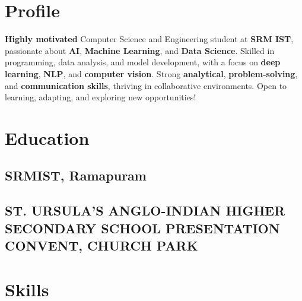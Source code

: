 \documentclass[]{deedy-resume-openfont}
\begin{document}
\vspace{24pt}

\begin{minipage}[t]{0.45\textwidth} 

\section{\textbf{Profile}}
\vspace{2pt}

\textbf{Highly motivated} Computer Science and Engineering student at \textbf{SRM IST}, passionate about \textbf{AI}, \textbf{Machine Learning}, and \textbf{Data Science}. Skilled in programming, data analysis, and model development, with a focus on \textbf{deep learning}, \textbf{NLP}, and \textbf{computer vision}. Strong \textbf{analytical}, \textbf{problem-solving}, and \textbf{communication skills}, thriving in collaborative environments. Open to learning, adapting, and exploring new opportunities!

\vspace{4pt}

\section{Education}
\vspace{2pt}
\subsection{SRMIST, Ramapuram}
\vspace{4pt}
\vspace{12pt}
\subsection{ST. URSULA'S ANGLO-INDIAN HIGHER SECONDARY
SCHOOL PRESENTATION CONVENT, CHURCH PARK}

\vspace{4pt}

\section{Skills}
\vspace{2pt} 

\end{minipage}
\end{document}
